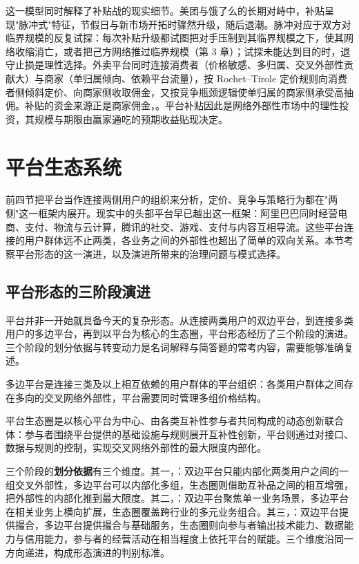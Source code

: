 这一模型同时解释了补贴战的现实细节。美团与饿了么的长期对峙中，补贴呈现"脉冲式"特征，节假日与新市场开拓时骤然升级，随后退潮。脉冲对应于双方对临界规模的反复试探：每次补贴升级都试图把对手压制到其临界规模之下，使其网络收缩消亡，或者把己方网络推过临界规模（第 3 章）；试探未能达到目的时，退守止损是理性选择。外卖平台同时连接消费者（价格敏感、多归属、交叉外部性贡献大）与商家（单归属倾向、依赖平台流量），按 Rochet–Tirole 定价规则向消费者侧倾斜定价、向商家侧收取佣金，又按竞争瓶颈逻辑使单归属的商家侧承受高抽佣。补贴的资金来源正是商家佣金，。平台补贴因此是网络外部性市场中的理性投资，其规模与期限由赢家通吃的预期收益贴现决定。

\section{平台生态系统}

前四节把平台当作连接两侧用户的组织来分析，定价、竞争与策略行为都在"两侧"这一框架内展开。现实中的头部平台早已越出这一框架：阿里巴巴同时经营电商、支付、物流与云计算，腾讯的社交、游戏、支付与内容互相导流。这些平台连接的用户群体远不止两类，各业务之间的外部性也超出了简单的双向关系。本节考察平台形态的这一演进，以及演进所带来的治理问题与模式选择。

\subsection{平台形态的三阶段演进}

平台并非一开始就具备今天的复杂形态。从连接两类用户的双边平台，到连接多类用户的多边平台，再到以平台为核心的生态圈，平台形态经历了三个阶段的演进。三个阶段的划分依据与转变动力是名词解释与简答题的常考内容，需要能够准确复述。

\begin{definition}
多边平台是连接三类及以上相互依赖的用户群体的平台组织：各类用户群体之间存在多向的交叉网络外部性，平台需要同时管理多组价格结构。
\end{definition}

\begin{definition}
平台生态圈是以核心平台为中心、由各类互补性参与者共同构成的动态创新联合体：参与者围绕平台提供的基础设施与规则展开互补性创新，平台则通过对接口、数据与规则的控制，实现交叉网络外部性的最大限度内部化。
\end{definition}

三个阶段的\textbf{划分依据}有三个维度。其一，：双边平台只能内部化两类用户之间的一组交叉外部性，多边平台可以内部化多组，生态圈则借助互补品之间的相互增强，把外部性的内部化推到最大限度。其二，：双边平台聚焦单一业务场景，多边平台在相关业务上横向扩展，生态圈覆盖跨行业的多元业务组合。其三，：双边平台提供撮合，多边平台提供撮合与基础服务，生态圈则向参与者输出技术能力、数据能力与信用能力，参与者的经营活动在相当程度上依托平台的赋能。三个维度沿同一方向递进，构成形态演进的判别标准。

